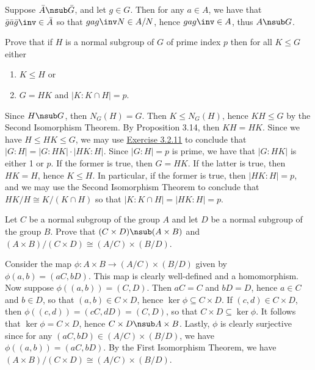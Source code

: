 \begin{problems}
\begin{sol}
\begin{enumerate}
            \noindent \leftimp Suppose $\bar A \nsub \bar G$, and let $g \in G$. Then for any $a \in A$, we have that $\bar g \bar a \bar g\inv \in \bar A$ so that $gag\inv N \in A/N$, hence $gag\inv \in A$, thus $A \nsub G$. \qh
        \end{enumerate}
    \end{sol}
    \item \label{ex3.3.3} Prove that if $H$ is a normal subgroup of $G$ of prime index $p$ then for all $K \leq G$ either
    \begin{enumerate}
        \item[(i)] $K \leq H$ or
        \item[(ii)] $G = HK$ and $|K : K \cap H| = p$.
    \end{enumerate}
    \begin{sol}
        Since $H \nsub G$, then $N_G(H) = G$. Then $K \leq N_G(H)$, hence $KH \leq G$ by the Second Isomorphism Theorem. By Proposition 3.14, then $KH = HK$. Since we have $H \leq HK \leq G$, we may use \hyperref[ex3.2.11]{Exercise 3.2.11} to conclude that $|G : H| = |G : HK| \cdot |HK : H|$. Since $|G : H| = p$ is prime, we have that $|G : HK|$ is either 1 or $p$. If the former is true, then $G = HK$. If the latter is true, then $HK = H$, hence $K \leq H$. In particular, if the former is true, then $|HK : H| = p$, and we may use the Second Isomorphism Theorem to conclude that $HK/H \cong K/(K \cap H)$ so that $|K : K \cap H| = |HK : H| = p$.
    \end{sol}
    \item Let $C$ be a normal subgroup of the group $A$ and let $D$ be a normal subgroup of the group $B$. Prove that $(C \times D) \nsub (A \times B)$ and $(A \times B)/(C \times D) \cong (A/C) \times (B/D)$.
    \begin{sol}
        Consider the map $\phi : A \times B \to (A/C) \times (B/D)$ given by $\phi(a, b) = (aC, bD)$. This map is clearly well-defined and a homomorphism. Now suppose $\phi((a, b)) = (C, D)$. Then $aC = C$ and $bD = D$, hence $a \in C$ and $b \in D$, so that $(a, b) \in C \times D$, hence $\ker\phi \subseteq C \times D$. If $(c, d) \in C \times D$, then $\phi((c, d)) = (cC, dD) = (C, D)$, so that $C \times D \subseteq \ker\phi$. It follows that $\ker\phi = C \times D$, hence $C \times D \nsub A \times B$. Lastly, $\phi$ is clearly surjective since for any $(aC, bD) \in (A/C) \times (B/D)$, we have $\phi((a, b)) = (aC, bD)$. By the First Isomorphism Theorem, we have $(A \times B)/(C \times D) \cong (A/C) \times (B/D)$.
    \end{sol}

\end{problems}
